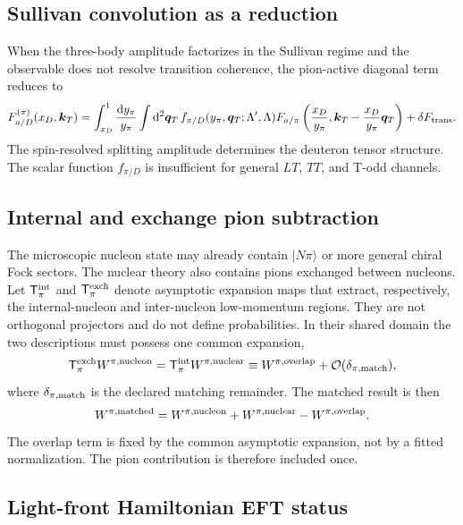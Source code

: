 \documentclass[11pt]{article}
\newcommand{\kT}{\bm{k}_{T}}
\newcommand{\qT}{\bm{q}_{T}}
\newcommand{\dd}{\mathrm{d}}
\begin{document}
\subsection{Sullivan convolution as a reduction}

When the three-body amplitude factorizes in the Sullivan regime and the
observable does not resolve transition coherence, the pion-active diagonal
term reduces to
\begin{equation}
 F_{a/D}^{(\pi)}(x_D,\kT)
 =\int_{x_D}^{1}\frac{\dd y_\pi}{y_\pi}
 \int\dd^2\qT\,
 f_{\pi/D}(y_\pi,\qT;\Lambda',\Lambda)
 F_{a/\pi}
 \left(\frac{x_D}{y_\pi},
 \kT-\frac{x_D}{y_\pi}\qT\right)
 +\delta F_{\rm trans}.
\label{eq:sullivan-reduction}
\end{equation}
The spin-resolved splitting amplitude determines the deuteron tensor
structure.  The scalar function \(f_{\pi/D}\) is insufficient for general
\(LT\), \(TT\), and T-odd channels.

\subsection{Internal and exchange pion subtraction}

The microscopic nucleon state may already contain \(|N\pi\rangle\) or more
general chiral Fock sectors.  The nuclear theory also contains pions exchanged
between nucleons.  Let \(\mathsf T_{\pi}^{\rm int}\) and
\(\mathsf T_{\pi}^{\rm exch}\) denote asymptotic expansion maps that extract,
respectively, the internal-nucleon and inter-nucleon low-momentum regions.
They are not orthogonal projectors and do not define probabilities.  In their
shared domain the two descriptions must possess one common expansion,
\begin{equation}
 \mathsf T_{\pi}^{\rm exch}W^{\pi,\rm nucleon}
 =\mathsf T_{\pi}^{\rm int}W^{\pi,\rm nuclear}
 \equiv W^{\pi,\rm overlap}
 +\mathcal O(\delta_{\pi,\rm match}),
\label{eq:pion-region-overlap}
\end{equation}
where \(\delta_{\pi,\rm match}\) is the declared matching remainder.  The
matched result is then
\begin{equation}
 W^{\pi,\rm matched}
 =W^{\pi,\rm nucleon}
 +W^{\pi,\rm nuclear}
 -W^{\pi,\rm overlap}.
\label{eq:pion-double-counting-subtraction}
\end{equation}
The overlap term is fixed by the common asymptotic expansion, not by a fitted
normalization.  The pion contribution is therefore included once.

\subsection{Light-front Hamiltonian EFT status}
\end{document}
